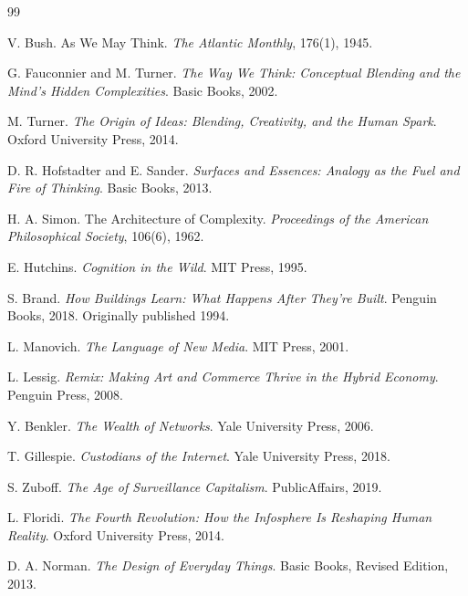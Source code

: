 \documentclass[11pt,oneside]{article}
\begin{document}
\newpage
\begin{thebibliography}{99}

V. Bush.
\newblock As We May Think.
\newblock \emph{The Atlantic Monthly}, 176(1), 1945.

G. Fauconnier and M. Turner.
\newblock \emph{The Way We Think: Conceptual Blending and the Mind's Hidden Complexities}.
\newblock Basic Books, 2002.

M. Turner.
\newblock \emph{The Origin of Ideas: Blending, Creativity, and the Human Spark}.
\newblock Oxford University Press, 2014.

D. R. Hofstadter and E. Sander.
\newblock \emph{Surfaces and Essences: Analogy as the Fuel and Fire of Thinking}.
\newblock Basic Books, 2013.

H. A. Simon.
\newblock The Architecture of Complexity.
\newblock \emph{Proceedings of the American Philosophical Society}, 106(6), 1962.

E. Hutchins.
\newblock \emph{Cognition in the Wild}.
\newblock MIT Press, 1995.

S. Brand.
\newblock \emph{How Buildings Learn: What Happens After They’re Built}.
\newblock Penguin Books, 2018.
\newblock Originally published 1994.

L. Manovich.
\newblock \emph{The Language of New Media}.
\newblock MIT Press, 2001.

L. Lessig.
\newblock \emph{Remix: Making Art and Commerce Thrive in the Hybrid Economy}.
\newblock Penguin Press, 2008.

Y. Benkler.
\newblock \emph{The Wealth of Networks}.
\newblock Yale University Press, 2006.

T. Gillespie.
\newblock \emph{Custodians of the Internet}.
\newblock Yale University Press, 2018.

S. Zuboff.
\newblock \emph{The Age of Surveillance Capitalism}.
\newblock PublicAffairs, 2019.

L. Floridi.
\newblock \emph{The Fourth Revolution: How the Infosphere Is Reshaping Human Reality}.
\newblock Oxford University Press, 2014.

D. A. Norman.
\newblock \emph{The Design of Everyday Things}.
\newblock Basic Books, Revised Edition, 2013.


\end{thebibliography}
\end{document}
